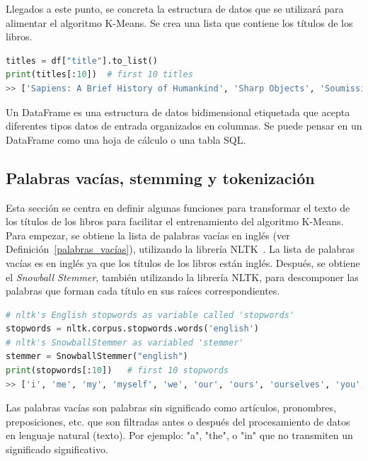 \documentclass{uimppracticas}
\begin{document}
Llegados a este punto, se concreta la estructura de datos que se utilizará para alimentar el algoritmo K-Means. Se crea una lista que contiene los títulos de los libros.

\begin{lstlisting}[language=python]
titles = df["title"].to_list()
print(titles[:10])  # first 10 titles
>> ['Sapiens: A Brief History of Humankind', 'Sharp Objects', 'Soumission', 'Tipping the Velvet', 'A Light in the Attic', "It's Only the Himalayas", 'Libertarianism for Beginners', 'Mesaerion: The Best Science Fiction Stories 1800-1849', 'Olio', 'Our Band Could Be Your Life: Scenes from the American Indie Underground, 1981-1991']
\end{lstlisting}

\begin{definition}\label{dataframe}
Un DataFrame es una estructura de datos bidimensional etiquetada que acepta diferentes tipos datos de entrada organizados en columnas. Se puede pensar en un DataFrame como una hoja de cálculo o una tabla SQL.
\end{definition}

\subsection{Palabras vacías, stemming y tokenización}\label{stem_token}

Esta sección se centra en definir algunas funciones para transformar el texto de los títulos de los libros para facilitar el entrenamiento del algoritmo K-Means. Para empezar, se obtiene la lista de palabras vacías en inglés (ver Definición~\ref{palabras_vacías}), utilizando la librería NLTK~\cite{bird2009natural}. La lista de palabras vacías es en inglés ya que los títulos de los libros están inglés. Después, se obtiene el \textit{Snowball Stemmer}, también utilizando la librería NLTK, para descomponer las palabras que forman cada título en sus raíces correspondientes.

\begin{lstlisting}[language=python]
# nltk's English stopwords as variable called 'stopwords'	
stopwords = nltk.corpus.stopwords.words('english')  
# nltk's SnowballStemmer as variabled 'stemmer'
stemmer = SnowballStemmer("english")
print(stopwords[:10])   # first 10 stopwords
>> ['i', 'me', 'my', 'myself', 'we', 'our', 'ours', 'ourselves', 'you', "you're"]    
\end{lstlisting}

\begin{definition}\label{palabras_vacías}
Las palabras vacías son palabras sin significado como artículos, pronombres, preposiciones, etc. que son filtradas antes o después del procesamiento de datos en lenguaje natural (texto). Por ejemplo: "a", "the", o "in" que no transmiten un significado significativo.
\end{definition}
\end{document}
